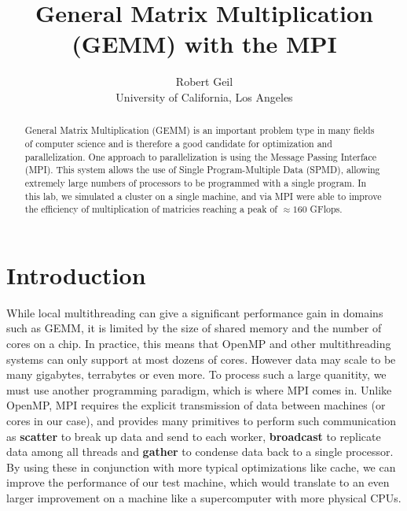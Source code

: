 \documentclass[letterpaper,twocolumn,10pt]{article}
\begin{document}

\date{}

\title{\Large \bf General Matrix Multiplication (GEMM) with the MPI}

\author{
{\rm Robert Geil}\\
University of California, Los Angeles
} %

\maketitle

\begin{abstract}
General Matrix Multiplication (GEMM) is an important problem type in many fields
of computer science and is therefore a good candidate for optimization and
parallelization. One approach to parallelization is using the Message Passing
Interface (MPI). This system allows the use of Single Program-Multiple Data
(SPMD), allowing extremely large numbers of processors to be programmed with a
single program. In this lab, we simulated a cluster on a single machine, and via
MPI were able to improve the efficiency of multiplication of matricies reaching
a peak of $\approx 160$ GFlops.
\end{abstract}

\section{Introduction}

While local multithreading can give a significant performance
gain in domains such as GEMM, it is limited by the size of shared memory and the
number of cores on a chip. In practice, this means that OpenMP and other
multithreading systems can only support at most dozens of cores. However data
may scale to be many gigabytes, terrabytes or even more. To process such a
large quanitity, we must use another programming paradigm, which is where MPI
comes in. Unlike OpenMP, MPI requires the explicit transmission of data between
machines (or cores in our case), and provides many primitives to perform such
communication as \textbf{scatter} to break up data and send to each worker,
\textbf{broadcast} to replicate data among all threads and \textbf{gather} to
condense data back to a single processor. By using these in conjunction with
more typical optimizations like cache, we can improve the performance of our
test machine, which would translate to an even larger improvement on a
machine like a supercomputer with more physical CPUs.
\end{document}
